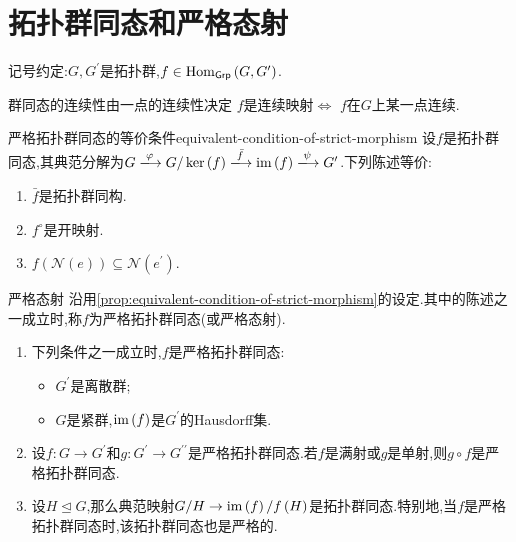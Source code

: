 \section{拓扑群同态和严格态射}

记号约定:$G,G^{\prime}$是拓扑群,$f\in\operatorname{Hom}_{\mathsf{Grp}}\left(G,G^{\prime}\right)$.

\begin{proposition}{群同态的连续性由一点的连续性决定}{}
	$f$是连续映射$\iff$ $f$在$G$上某一点连续.
\end{proposition}

\begin{proposition}{严格拓扑群同态的等价条件}{equivalent-condition-of-strict-morphism}
	设$f$是拓扑群同态,其典范分解为$G\xlongrightarrow{\varphi}G/\ker\left(f\right)\xlongrightarrow{\bar{f}}\im\left(f\right)\xlongrightarrow{\psi}G^{\prime}$.下列陈述等价:
	\begin{enumerate}
		\item $\bar{f}$是拓扑群同构.
		\item $f^{\circ}$是开映射.
		\item $f\left(\mathcal{N}\left(e\right)\right)\subseteq\mathcal{N}\left(e^{\prime}\right)$.
	\end{enumerate}
\end{proposition}

\begin{definition}{严格态射}{}
	沿用\cref{prop:equivalent-condition-of-strict-morphism}的设定.其中的陈述之一成立时,称$f$为严格拓扑群同态(或严格态射).
\end{definition}

\begin{remark}{}{}
	\begin{enumerate}
		\item 下列条件之一成立时,$f$是严格拓扑群同态:
		\begin{itemize}
			\item $G^{\prime}$是离散群;
			\item $G$是紧群,$\operatorname{im}\left(f\right)$是$G^{\prime}$的Hausdorff集.
		\end{itemize}
		\item 设$f:G\to G^{\prime}$和$g:G^{\prime}\to G^{\prime\prime}$是严格拓扑群同态.若$f$是满射或$g$是单射,则$g\circ f$是严格拓扑群同态.
		\item 设$H\unlhd G$,那么典范映射$G/H\to \operatorname{im}\left(f\right)/f\left(H\right)$是拓扑群同态.特别地,当$f$是严格拓扑群同态时,该拓扑群同态也是严格的.
	\end{enumerate}
\end{remark}


